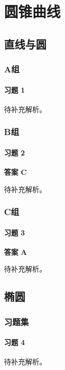 \chapter{圆锥曲线}

\section{直线与圆}

\subsection*{A组}

\subsubsection*{习题 1}
\begin{solution}
	待补充解析。
\end{solution}

\subsection*{B组}

\subsubsection*{习题 2}
\begin{solution}
	\textbf{答案 C}

	待补充解析。
\end{solution}

\subsection*{C组}

\subsubsection*{习题 3}
\begin{solution}
	\textbf{答案 A}

	待补充解析。
\end{solution}

\section{椭圆}

\subsection*{习题集}

\subsubsection*{习题 4}
\begin{solution}
	待补充解析。
\end{solution}

